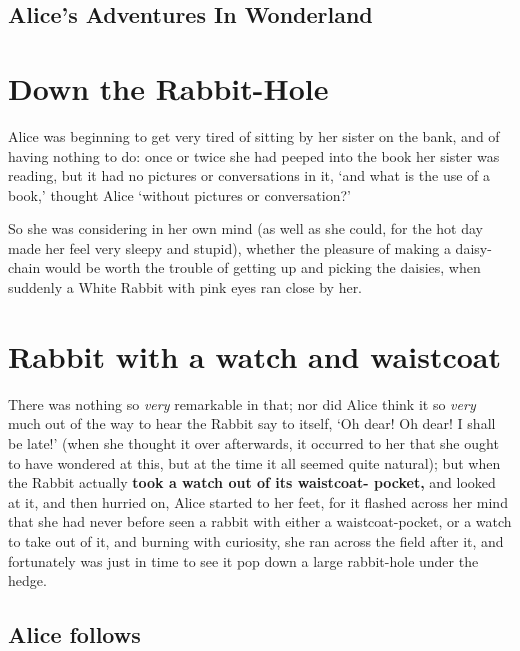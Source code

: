 \documentclass[12pt]{article} %
\begin{document}
\pagestyle{empty} %

\begin{center}
\section*{Alice's Adventures In Wonderland}
\end{center}

\section{Down the Rabbit-Hole}

Alice was beginning to get very tired of sitting by her sister
on the bank, and of having nothing to do:  once or twice she had
peeped into the book her sister was reading, but it had no
pictures or conversations in it, `and what is the use of a book,'
thought Alice `without pictures or conversation?'

So she was considering in her own mind (as well as she could,
for the hot day made her feel very sleepy and stupid), whether
the pleasure of making a daisy-chain would be worth the trouble
of getting up and picking the daisies, when suddenly a White
Rabbit with pink eyes ran close by her.

\section{Rabbit with a watch and waistcoat}

There was nothing so \emph{very} remarkable in that; nor did Alice
think it so \emph{very} much out of the way to hear the Rabbit say to
itself, `Oh dear!  Oh dear!  I shall be late!'  (when she thought it
over afterwards, it occurred to her that she ought to have wondered at
this, but at the time it all seemed quite natural); but when the
Rabbit actually \textbf{took a watch out of its waistcoat- pocket,} and
looked at it, and then hurried on, Alice started to her feet, for it
flashed across her mind that she had never before seen a rabbit with
either a waistcoat-pocket, or a watch to take out of it, and burning
with curiosity, she ran across the field after it, and fortunately was
just in time to see it pop down a large rabbit-hole under the hedge.

\subsection{Alice follows}
\end{document}
